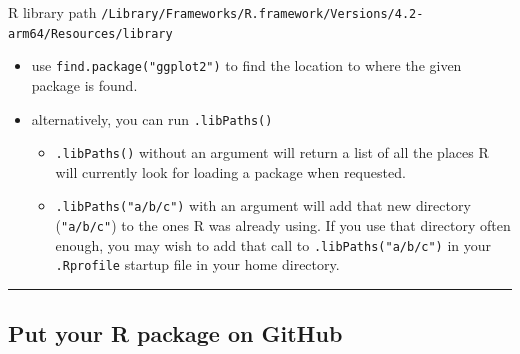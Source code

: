 \documentclass[
  a4paper,
  twoside,
  openright]{book}
\newenvironment{Shaded}{\begin{snugshade}}{\end{snugshade}}
\newcommand{\AttributeTok}[1]{\textcolor[rgb]{0.13,0.29,0.53}{#1}}
\newcommand{\CommentTok}[1]{\textcolor[rgb]{0.56,0.35,0.01}{\textit{#1}}}
\newcommand{\ConstantTok}[1]{\textcolor[rgb]{0.56,0.35,0.01}{#1}}
\newcommand{\DecValTok}[1]{\textcolor[rgb]{0.00,0.00,0.81}{#1}}
\newcommand{\DocumentationTok}[1]{\textcolor[rgb]{0.56,0.35,0.01}{\textbf{\textit{#1}}}}
\newcommand{\FunctionTok}[1]{\textcolor[rgb]{0.13,0.29,0.53}{\textbf{#1}}}
\newcommand{\NormalTok}[1]{#1}
\newcommand{\OtherTok}[1]{\textcolor[rgb]{0.56,0.35,0.01}{#1}}
\newcommand{\SpecialCharTok}[1]{\textcolor[rgb]{0.81,0.36,0.00}{\textbf{#1}}}
\newcommand{\StringTok}[1]{\textcolor[rgb]{0.31,0.60,0.02}{#1}}
\providecommand{\tightlist}{%
  \setlength{\itemsep}{0pt}\setlength{\parskip}{0pt}}
\theoremstyle{definition}
\theoremstyle{definition}
\theoremstyle{definition}
\theoremstyle{definition}
\theoremstyle{remark}
\begin{document}
\begin{Shaded}
\end{Shaded}

R library path \texttt{/Library/Frameworks/R.framework/Versions/4.2-arm64/Resources/library}

\begin{itemize}
\tightlist
\item
  use \texttt{find.package("ggplot2")} to find the location to where the given package is found.
\item
  alternatively, you can run \texttt{.libPaths()}

  \begin{itemize}
  \tightlist
  \item
    \texttt{.libPaths()} without an argument will return a list of all the places R will currently look for loading a package when requested.
  \item
    \texttt{.libPaths("a/b/c")} with an argument will add that new directory (\texttt{"a/b/c"}) to the ones R was already using. If you use that directory often enough, you may wish to add that call to \texttt{.libPaths("a/b/c")} in your \texttt{.Rprofile} startup file in your home directory.
  \end{itemize}
\end{itemize}

\begin{center}\rule{0.5\linewidth}{0.5pt}\end{center}

\subsection*{Put your R package on GitHub}\label{put-your-r-package-on-github}
\end{document}
